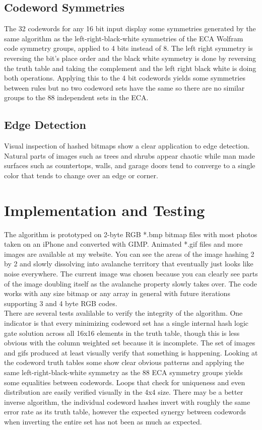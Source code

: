 \documentclass[11pt]{article}
\begin{document}
\subsection{Codeword Symmetries}
The 32 codewords for any 16 bit input display some symmetries generated by the same algorithm as the left-right-black-white symmetries of the ECA Wolfram code symmetry groups, applied to 4 bits instead of 8. The left right symmetry is reversing the bit's place order and the black white symmetry is done by reversing the truth table and taking the complement and the left right black white is doing both operations. Applying this to the 4 bit codewords yields some symmetries between rules but no two codeword sets have the same so there are no similar groups to the 88 independent sets in the ECA.\cite{Wolfram}\\

\subsection{Edge Detection}
Visual inspection of hashed bitmaps show a clear application to edge detection. Natural parts of images such as trees and shrubs appear chaotic while man made surfaces such as countertops, walls, and garage doors tend to converge to a single color that tends to change over an edge or corner.\\

\section{Implementation and Testing}

The algorithm is prototyped on 2-byte RGB *.bmp bitmap files with most photos taken on an iPhone and converted with GIMP. Animated *.gif files and more images are available at my website. You can see the areas of the image hashing 2 by 2 and slowly dissolving into avalanche territory that eventually just looks like noise everywhere. The current image was chosen because you can clearly see parts of the image doubling itself as the avalanche property slowly takes over. The code works with any size bitmap or any array in general with future iterations supporting 3 and 4 byte RGB codes. \\

There are several tests avalilable to verify the integrity of the algorithm. One indicator is that every minimizing codeword set has a single internal hash logic gate solution across all 16x16 elements in the truth table, though this is less obvious with the column weighted set because it is incomplete. The set of images and gifs produced at least visually verify that something is happening. Looking at the codeword truth tables some show clear obvious patterns and applying the same left-right-black-white symmetry as the 88 ECA symmetry groups \cite{Wolfram} yields some equalities between codewords. Loops that check for uniqueness and even distribution are easily verified visually in the 4x4 size. There may be a better inverse algorithm, the individual codeword hashes invert with roughly the same error rate as its truth table, however the expected synergy between codewords when inverting the entire set has not been as much as expected.\\
\end{document}

